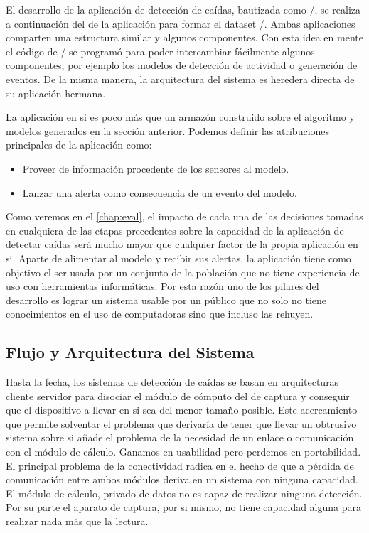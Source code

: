   El desarrollo de la aplicación de detección de caídas, bautizada como \ifell/, se realiza a continuación del de la aplicación para formar el dataset \accelcapture/. Ambas aplicaciones comparten una estructura similar y algunos componentes. Con esta idea en mente el código de \accelcapture/ se programó para poder intercambiar fácilmente algunos componentes, por ejemplo los modelos de detección de actividad o generación de eventos. De la misma manera, la arquitectura del sistema es heredera directa de su aplicación hermana.

La aplicación en si es poco más que un armazón construido sobre el algoritmo y modelos generados en la sección anterior. Podemos definir las atribuciones principales de la aplicación como:
\begin{itemize}
  \item Proveer de información procedente de los sensores al modelo.
  \item Lanzar una alerta como consecuencia de un evento del modelo.
\end{itemize}

Como veremos en el \autoref{chap:eval}, el impacto de cada una de las decisiones tomadas en cualquiera de las etapas precedentes sobre la capacidad de la aplicación de detectar caídas será mucho mayor que cualquier factor de la propia aplicación en si. Aparte de alimentar al modelo y recibir sus alertas, la aplicación tiene como objetivo el ser usada por un conjunto de la población que no tiene experiencia de uso con herramientas informáticas. Por esta razón uno de los pilares del desarrollo es lograr un sistema usable por un público que no solo no tiene conocimientos en el uso de computadoras sino que incluso las rehuyen.


\subsection{Flujo y Arquitectura del Sistema}
Hasta la fecha, los sistemas de detección de caídas se basan en arquitecturas cliente servidor para disociar el módulo de cómputo del de captura y conseguir que el dispositivo a llevar en si sea del menor tamaño posible. Este acercamiento que permite solventar el problema que derivaría de tener que llevar un obtrusivo sistema sobre si añade el problema de la necesidad de un enlace o comunicación con el módulo de cálculo. Ganamos en usabilidad pero perdemos en portabilidad. El principal problema de la conectividad radica en el hecho de que a pérdida de comunicación entre ambos módulos deriva en un sistema con ninguna capacidad. El módulo de cálculo, privado de datos no es capaz de realizar ninguna detección. Por su parte el aparato de captura, por si mismo, no tiene capacidad alguna para realizar nada más que la lectura.

